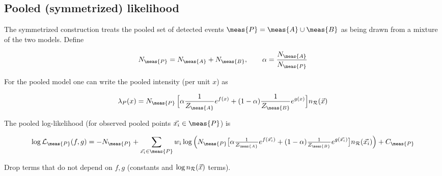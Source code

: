 \documentclass[../../ddppaper2.tex]{subfiles}
\begin{document}
\subsection{Pooled (symmetrized) likelihood}
The symmetrized construction treats the pooled set of detected events \(\meas{P}=\meas{A} \cup \meas{B}\) as being drawn from a mixture of the two models. Define

\[
N_\meas{P} = N_\meas{A} + N_\meas{B},\qquad \alpha=\frac{N_\meas{A}}{N_\meas{P}}
\]

For the pooled model one can write the pooled intensity (per unit \(x\)) as

\[
\lambda_{P}(x) = N_\meas{P}\,\Big[\alpha \frac{1}{Z_\meas{A}}e^{f(x)} + (1-\alpha)\frac{1}{Z_\meas{B}}e^{g(x)}\Big] \refdist
\]

The pooled log-likelihood (for observed pooled points \(\event\in\meas{P}\)) is

\[ \label{eq:pooled_log_likelihood}
\log\mathcal{L}_{\meas{P}}(f,g) = -N_\meas{P} + \sum_{\event\in\meas{P}} w_i \log\Big(N_\meas{P}\big[\alpha \tfrac{1}{Z_\meas{A}}e^{f(\event)} + (1-\alpha)\tfrac{1}{Z_\meas{B}}e^{g(\event)}\big] \refdist[\event] \Big) + C_{\meas{P}}
\]

Drop terms that do not depend on \(f,g\) (constants and \(\log n_{\mathcal{R}}({\vec{{x}}})\) terms).
\end{document}
